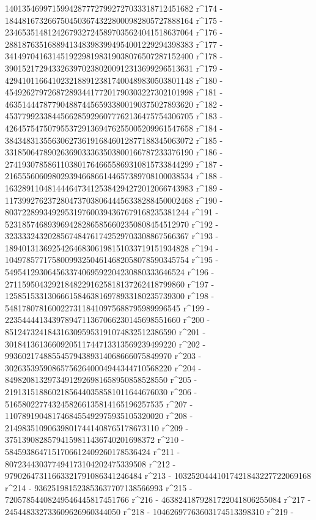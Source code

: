        14013546997159942877727992727033318712451682 r^174 - 
       18448167326675045036743228000982805727888164 r^175 - 
       23465351481242679327245897035624041518637064 r^176 - 
       28818763516889413483983994954001229294398383 r^177 - 
       34149704163145192298198319038076507287152400 r^178 - 
       39015217294332639702380200912313699296513631 r^179 - 
       42941011664102321889123817400489830503801148 r^180 - 
       45492627972687289344177201790303227302101998 r^181 - 
       46351444787790488744565933800190375027893620 r^182 - 
       45377992338445662859296077762136475754306705 r^183 - 
       42645754750795537291369476255005209961547658 r^184 - 
       38434831355630627361916846012877188345063072 r^185 - 
       33185064789026369033363503800166787233376190 r^186 - 
       27419307858611038017646655869310815733844299 r^187 - 
       21655560609802939466866144657389708100038534 r^188 - 
       16328911048144464734125384294272012066743983 r^189 - 
       11739927623728047370380644456338288450002468 r^190 - 
       8037228993492953197600394367679168235381244 r^191 - 
       5231857468939694282865856602350808454512970 r^192 - 
       3233332432028567484761742529703308867566367 r^193 - 
       1894013136925426468306198151033719151934828 r^194 - 
       1049785771758009932504614682058078590345754 r^195 - 
       549541293064563374069592204230880333646524 r^196 - 
       271159504329218482291625818137262418799860 r^197 - 
       125851533130666158463816978933180235739300 r^198 - 
       54817807816002273118410975688795989996545 r^199 - 
       22354444134397894711367066230145698551660 r^200 - 
       8512473241843163095953191074832512386590 r^201 - 
       3018413613660920511744713313569239499220 r^202 - 
       993602174885545794389314068666075849970 r^203 - 
       302635395908657562640004944344710568220 r^204 - 
       84982081329734912926981658950858528550 r^205 - 
       21913151886021856440358581011644676030 r^206 - 
       5165802277432458266135814165196257535 r^207 - 
       1107891904817468455492975935105320020 r^208 - 
       214983510906398017441408765178673110 r^209 - 
       37513908285794159811436740201698372 r^210 - 
       5845938647151706612409260178536424 r^211 - 
       807234430377494173104202475339508 r^212 - 
       97902647311663321791086341246484 r^213 - 
       10325204441017421843227722069168 r^214 - 
       936251981523853637707138566993 r^215 - 
       72057854408249546445817451766 r^216 - 
       4638241879281722041806255084 r^217 - 
       245448332733609626960344050 r^218 - 
       10462697763603174513398310 r^219 - 
